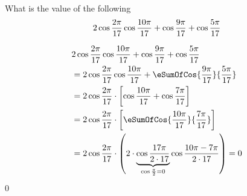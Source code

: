 




\question[4] What is the value of the following  
\[ 2\cos\dfrac{2\pi}{17}\cos\dfrac{10\pi}{17} + \cos\dfrac{9\pi}{17} + \cos\dfrac{5\pi}{17} \]

\watchout

\begin{solution}[\halfpage]
     \begin{align}
     	&2\cos\dfrac{\ve\pi}{\va}\cos\dfrac{\vb\pi}{\va} + 
     	\cos\dfrac{\vc\pi}{\va} + \cos\dfrac{\vd\pi}{\va} \nonumber \\
     	&= 2\cos\dfrac{\ve\pi}{\va}\cos\dfrac{\vb\pi}{\va} + 
     	\eSumOfCos{\frac{\vc\pi}{\va}}{\frac{\vd\pi}{\va}} \\
     	&= 2\cos\dfrac{\ve\pi}{\va}\cdot\left[ \cos\dfrac{\vb\pi}{\va} + \cos\dfrac{\vf\pi}{\va}\right] \\
     	&= 2\cos\dfrac{\ve\pi}{\va}\cdot\left[ \eSumOfCos{\frac{\vb\pi}{\va}}{\frac{\vf\pi}{\va}} \right] \\
     	&= 2\cos\dfrac{\ve\pi}{\va}\cdot
     	\left( 2\cdot\underbrace{\cos\dfrac{\va\pi}{2\cdot\va}}_{\cos\frac{\pi}{2} = 0}
     	\cos\dfrac{\vb\pi-\vf\pi}{2\cdot\va}\right) = 0 
     \end{align}
\end{solution}

\ifprintanswers\begin{codex}$0$\end{codex}\fi
